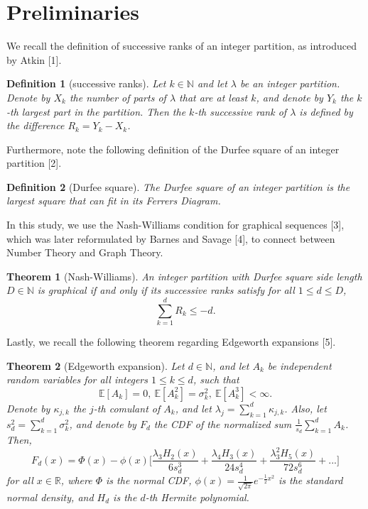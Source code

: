 \documentclass[pdflatex,sn-mathphys-num]{sn-jnl}%
\newtheorem{theorem}{Theorem}[section] %
\theoremstyle{thmstyleone}%
\theoremstyle{thmstyletwo}%
\theoremstyle{thmstylethree}%
\newtheorem{definition}{Definition}%
\theoremstyle{thmstylethree}%
\theoremstyle{thmstylethree}%
\begin{document}
\newpage

\section{Preliminaries}
We recall the definition of successive ranks of an integer partition, as introduced by Atkin [1].
\begin{definition}[successive ranks]
    Let $k\in\mathbb{N}$ and let $\lambda$ be an integer partition. Denote by $X_k$ the number of parts of $\lambda$ that are at least $k$, and denote by $Y_k$ the $k$-th largest part in the partition. Then the $k$-th successive rank of $\lambda$ is defined by the difference $R_k=Y_k-X_k$.
\end{definition}
Furthermore, note the following definition of the Durfee square of an integer partition [2].
\begin{definition}[Durfee square]
    The Durfee square of an integer partition is the largest square that can fit in its Ferrers Diagram.
\end{definition}
In this study, we use the Nash-Williams condition for graphical sequences [3], which was later reformulated by Barnes and Savage [4], to connect between Number Theory and Graph Theory. 
\begin{theorem}[Nash-Williams]\label{Nash}
    An integer partition with Durfee square side length $D\in\mathbb{N}$ is graphical if and only if its successive ranks satisfy for all $1\le d\le D$,
    \begin{equation*}
        \sum_{k=1}^dR_k\le-d.
    \end{equation*}
\end{theorem}
Lastly, we recall the following theorem regarding Edgeworth expansions [5].
\begin{theorem}[Edgeworth expansion]\label{Edge}
    Let $d\in\mathbb{N}$, and let $A_k$ be independent random variables for all integers $1\le k\le d$, such that
\begin{equation*}
    \mathbb{E}[A_k]=0, \ \mathbb{E}[A_k^2]=\sigma_k^2, \ \mathbb{E}[A_k^3]<\infty.
\end{equation*}
Denote by $\kappa_{j,k}$ the $j$-th comulant of $A_k$, and let $\lambda_j=\sum_{k=1}^d\kappa_{j,k}$. Also, let $s_d^2=\sum_{k=1}^d\sigma_k^2$, and denote by $F_d$ the CDF of the normalized sum $\frac{1}{s_d}\sum_{k=1}^dA_k$. Then,
\begin{equation*}\label{eq11}
    F_d(x)=\Phi(x)-\phi(x)\Bigg[\frac{\lambda_3H_2(x)}{6s_d^3}
    +\frac{\lambda_4H_3(x)}{24s_d^4}+\frac{\lambda_3^2H_5(x)}{72s_d^6}+...\Bigg]
\end{equation*}
for all $x\in\mathbb{R}$, where $\Phi$ is the normal CDF, $\phi(x)=\frac{1}{\sqrt{2\pi}}e^{-\frac{1}{2}x^2}$ is the standard normal density, and $H_d$ is the $d$-th Hermite polynomial.
\end{theorem}
\end{document}
